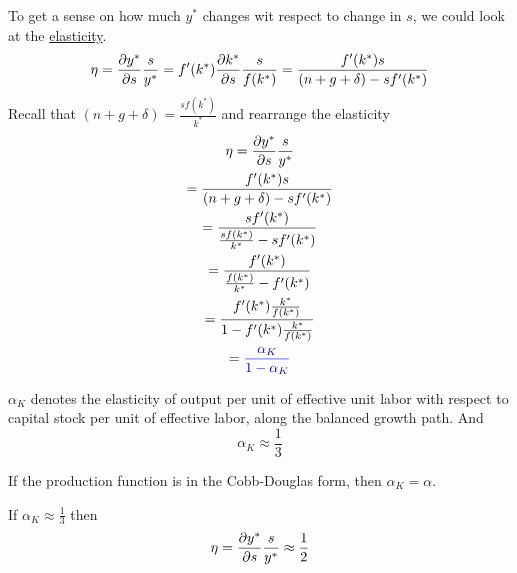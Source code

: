 \documentclass[11pt]{article}
\begin{document}
			\par To get a sense on how much $y^*$ changes wit respect to change in $s$, we could look at the \ul{elasticity}.
			\[
				\eta = \frac{\partial{y^*}}{\partial{s}}\frac{s}{y^*} = f'(k^*) \frac{\partial{k^*}}{\partial{s}} \frac{s}{f(k^*)} = \frac{f'(k^*)s}{(n+g+\delta) - sf'(k^*)}
			\]
			Recall that $(n+g+\delta) = \frac{sf(k^*)}{k^*}$ and rearrange the elasticity
			\begin{gather*}
				\eta = \frac{\partial{y^*}}{\partial{s}}\frac{s}{y^*} \\
				= \frac{f'(k^*)s}{(n+g+\delta) - sf'(k^*)} \\
				= \frac{s f'(k^*)}{\frac{s f(k^*)}{k^*} - sf'(k^*)} \\
				= \frac{f'(k^*)}{\frac{f(k^*)}{k^*} - f'(k^*)} \\
				= \frac{f'(k^*) \frac{k^*}{f(k^*)}}{1 - f'(k^*)\frac{k^*}{f(k^*)}} \\
				= \textcolor{blue}{
					\frac{\alpha_K}{1 - \alpha_K}
					} \\
			\end{gather*}
			
			\begin{remark}
				$\alpha_K$ denotes the elasticity of output per unit of effective unit labor with respect to capital stock per unit of effective labor, along the balanced growth path. And
				\[
					\alpha_K \approx \frac{1}{3}
				\]
			\end{remark}
			
			\begin{remark}
				If the production function is in the Cobb-Douglas form, then $\alpha_K = \alpha$.
			\end{remark}
			
			\begin{example}
				If $\alpha_K \approx \frac{1}{3}$ then \[\eta = \frac{\partial{y^*}}{\partial{s}} \frac{s}{y^*} \approx \frac{1}{2}\]
			\end{example}
			
\end{document}
